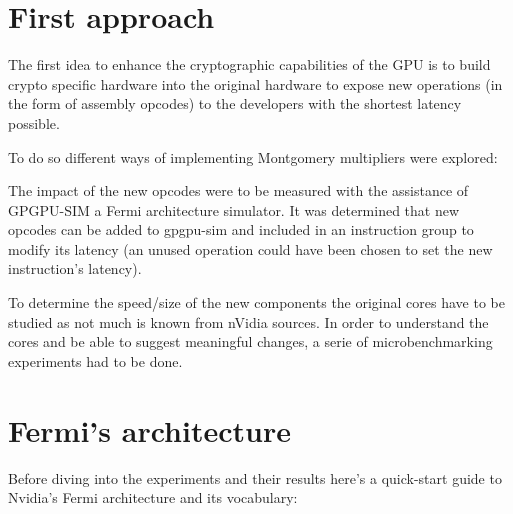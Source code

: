 \documentclass{report}
\begin{document}
\chapter{First approach}
    The first idea to enhance the cryptographic capabilities of the GPU is to
    build crypto specific hardware into the original hardware to expose new 
    operations (in the form of assembly opcodes) to the developers with the 
    shortest latency possible. 
    
    To do so different ways of implementing Montgomery multipliers were
    explored:

    The impact of the new opcodes were to be measured with the assistance of
    GPGPU-SIM\cite{gpgpusim09} a Fermi architecture simulator. It was determined
    that new opcodes can be added to gpgpu-sim and included in an instruction group
    to modify its latency (an unused operation could have been chosen to set the new
    instruction's latency).

    To determine the speed/size of the new components the original cores have to
    be studied as not much is known from nVidia sources. In order to understand 
    the cores and be able to suggest meaningful changes, a serie of microbenchmarking 
    experiments had to be done. 


\chapter{Fermi's architecture}
    Before diving into the experiments and their results here's a quick-start
    guide to Nvidia's Fermi architecture and its vocabulary:
\end{document}
